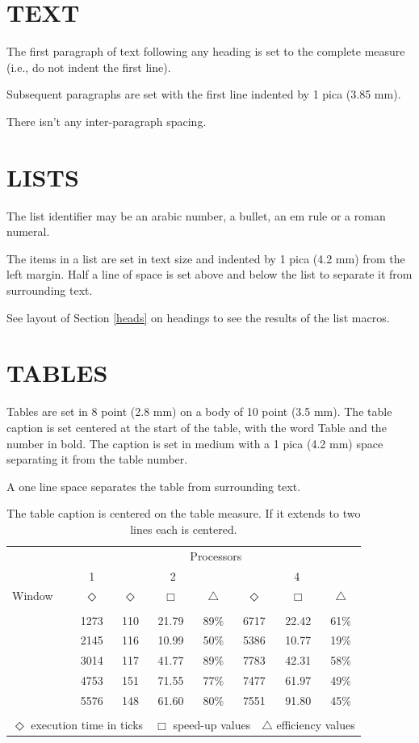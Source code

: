 \documentclass{ecai2012}
\begin{document}
\section{TEXT}
The first paragraph of text following any heading is set to the
complete measure (i.e., do not indent the first line).

Subsequent paragraphs are set with the first line indented
by 1 pica (3.85 mm).

There isn't any inter-paragraph spacing.

\section{LISTS}
The list identifier may be an arabic number, a bullet, an em
rule or a roman numeral.

The items in a list are set in text size and indented by 1
pica (4.2 mm) from the left margin. Half a line of space is
set above and below the list to separate it from surrounding
text.

See layout of Section \ref{heads} on headings to see the results of the list macros.

\section{TABLES}
Tables are set in 8 point (2.8 mm) on a body of 10 point (3.5 mm).
The table caption is set centered at the start of the table, with
the word Table and the number in bold. The caption is set in medium
with a 1 pica (4.2 mm) space separating it from the table number.

A one line space separates the table from surrounding text.

\begin{table}
\begin{center}
{\caption{The table caption is centered on the table measure. If it
extends to two lines each is centered.}\label{table1}}
\begin{tabular}{lccccccc}
\hline
\rule{0pt}{12pt}
&\multicolumn{7}{c}{Processors}\\
&1&\multicolumn{3}{c}{2}&\multicolumn{3}{c}{4}\\
\cline{2-8}
\rule{0pt}{12pt}
Window&$\Diamond$&$\Diamond$&$\Box$&$\bigtriangleup$&$\Diamond$&$\Box$&$\bigtriangleup$
\\
\hline
\\[-6pt]
\quad1&1273&110&21.79&89\%&6717&22.42&61\%\\
\quad2&2145&116&10.99&50\%&5386&10.77&19\%\\
\quad3&3014&117&41.77&89\%&7783&42.31&58\%\\
\quad4&4753&151&71.55&77\%&7477&61.97&49\%\\
\quad5&5576&148&61.60&80\%&7551&91.80&45\%
\\
\hline
\\[-6pt]
\multicolumn{8}{l}{$\Diamond$ execution time in ticks\ \
$\Box$ speed-up values\ \
$\bigtriangleup$ efficiency values}
\end{tabular}
\end{center}
\end{table}
\end{document}
